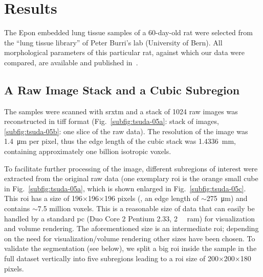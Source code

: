 \section{Results}
The Epon embedded lung tissue samples of a 60-day-old rat were selected from the ``lung tissue library'' of Peter Burri's lab (University of Bern). All morphological parameters of this particular rat, against which our data were compared, are available and published in~\citet{Tschanz2003}.

\subsection{A Raw Image Stack and a Cubic Subregion}
The samples were scanned with \ac{srxtm} and a stack of 1024 raw images was reconstructed in tiff format (Fig.~\ref{subfig:tsuda-05a}: stack of images, \ref{subfig:tsuda-05b}: one slice of the raw data). The resolution of the image was \SI{1.4}{\micro\meter} per pixel, thus the edge length of the cubic stack was \SI{1.4336}{\milli\meter}, containing approximately one billion isotropic voxels.

To facilitate further processing of the image, different subregions of interest were extracted from the original raw data (one exemplary \ac{roi} is the orange small cube in Fig.~\ref{subfig:tsuda-05a}, which is shown enlarged in Fig.~\ref{subfig:tsuda-05c}. This \ac{roi} has a size of 196$\times$196$\times$196 pixels (\ie, an edge length of $\sim$\SI{275}{\micro\meter}) and contains $\sim$7.5 million voxels. This is a reasonable size of data that can easily be handled by a standard \acs{pc} (Duo Core 2 Pentium \SI{2.33}{\gigahertz}, \SI{2}{\giga\byte} \acs{ram}) for visualization and volume rendering. The aforementioned size is an intermediate \ac{roi}; depending on the need for visualization/volume rendering other sizes have been chosen. To validate the segmentation (see below), we split a big \ac{roi} inside the sample in the full dataset vertically into five subregions leading to a \ac{roi} size of 200$\times$200$\times$180 pixels.

